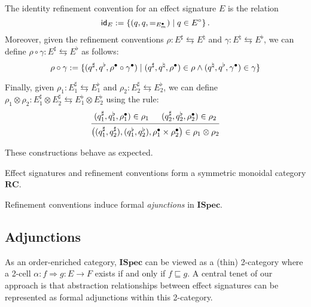 \documentclass[acmsmall,review,anonymous]{acmart}\settopmatter{printfolios=true,printccs=false,printacmref=false}
\newcommand{\ISpec}{\mathbf{ISpec}}
\begin{document}
\begin{definition} \label{def:rccomp}
The identity refinement convention
for an effect signature $E$
is the relation
\[
   \mathsf{id} _E := \{(q, q, {=}_{E^\bullet_m}) \mid q \in E^\circ\} \,.
\]
Moreover,
given the refinement conventions
$\rho : E^\sharp \leftrightarrows E^\natural$
and
$\gamma : E^\natural \leftrightarrows E^\flat$,
we can define
$\rho \circ \gamma : E^\sharp \leftrightarrows E^\flat$ as follows:
\[
  \rho \circ \gamma :=
    \{ (q^\sharp, q^\flat, \rho^\bullet \circ \gamma^\bullet) \mid
       (q^\sharp, q^\natural, \rho^\bullet) \in \rho \wedge
       (q^\natural, q^\flat, \gamma^\bullet) \in \gamma \}
\]

Finally, given
$\rho_1 : E^\sharp_1 \leftrightarrows E^\flat_1$ and
$\rho_2 : E^\sharp_2 \leftrightarrows E^\flat_2$,
we can define
$\rho_1 \otimes \rho_2 : E^\sharp_1 \otimes E^\sharp_2
\leftrightarrows E^\flat_1 \otimes E^\flat_2$
using the rule:
\[
  \begin{prooftree}
    \hypo{(q^\sharp_1, q^\flat_1, \rho_1^\ans) \in \rho_1}
    \hypo{(q^\sharp_2, q^\flat_2, \rho_2^\ans) \in \rho_2}
    \infer2{
      \big( (q^\sharp_1, q^\sharp_2), (q^\flat_1, q^\flat_2),
      \rho_1^\ans \times \rho_2^\ans \big)
      \in \rho_1 \otimes \rho_2}
  \end{prooftree}
\]
\end{definition}

\noindent
These constructions behave as expected.

\begin{theorem}
Effect signatures and refinement conventions
form a symmetric monoidal category $\mathbf{RC}$.
\end{theorem}

\noindent
Refinement conventions induce formal \emph{ajunctions} in $\ISpec$.


\subsection{Adjunctions} %

As an order-enriched category,
$\ISpec$ can be viewed as a (thin) 2-category
where
a 2-cell $\alpha : f \Rightarrow g : E \rightarrow F$ exists
if and only if $f \sqsubseteq g$.
A central tenet of our approach
is that abstraction relationships
between effect signatures
can be represented as formal adjunctions
within this 2-category.
\end{document}
